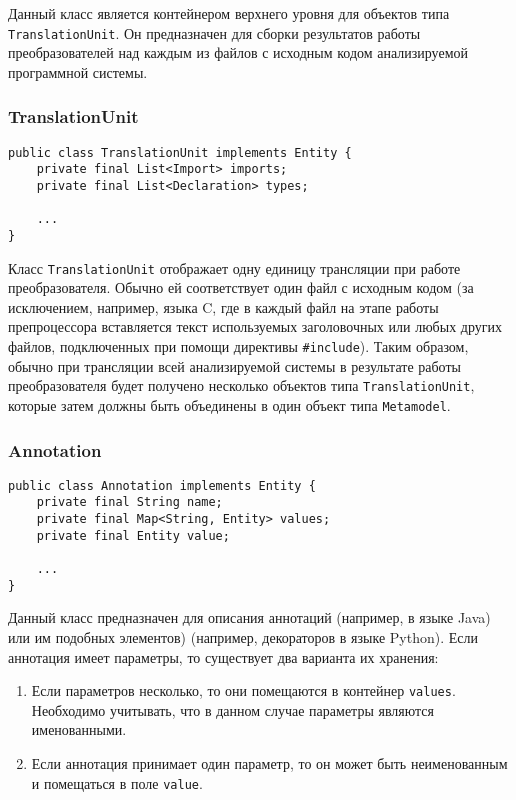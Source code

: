 Данный класс является контейнером верхнего уровня для объектов типа
\texttt{TranslationUnit}. Он предназначен для сборки результатов работы
преобразователей над каждым из файлов с исходным кодом анализируемой программной
системы.

\vspace{10pt}
\subsubsection{TranslationUnit}

\begin{lstlisting}[caption={Класс TranslationUnit}]
public class TranslationUnit implements Entity {
    private final List<Import> imports;
    private final List<Declaration> types;

    ...
}
\end{lstlisting}

Класс \texttt{TranslationUnit} отображает одну единицу трансляции при работе
преобразователя. Обычно ей соответствует один файл с исходным кодом (за
исключением, например, языка C, где в каждый файл на этапе работы препроцессора
вставляется текст используемых заголовочных или любых других файлов,
подключенных при помощи директивы \texttt{\#include}). Таким образом, обычно при
трансляции всей анализируемой системы в результате работы преобразователя
будет получено несколько объектов типа \texttt{TranslationUnit}, которые затем
должны быть объединены в один объект типа \texttt{Metamodel}.

\vspace{10pt}
\subsubsection{Annotation}

\begin{lstlisting}[caption={Класс Annotation}]
public class Annotation implements Entity {
    private final String name;
    private final Map<String, Entity> values;
    private final Entity value;

    ...
}
\end{lstlisting}

Данный класс предназначен для описания аннотаций (например, в языке Java) или им
подобных элементов) (например, декораторов в языке Python). Если аннотация имеет
параметры, то существует два варианта их хранения:

\begin{enumerate}
    \item Если параметров несколько, то они помещаются в контейнер
    \texttt{values}. Необходимо учитывать, что в данном случае параметры
    являются именованными.
    \item Если аннотация принимает один параметр, то он может быть неименованным
    и помещаться в поле \texttt{value}.
\end{enumerate}

